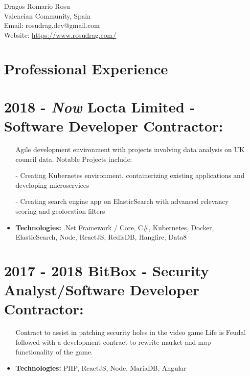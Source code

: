 \documentclass[12pt,a4paper]{res}
\begin{document}
\thispagestyle{empty}
  \begin{center}
  \Large{Dragos Romario Rosu  \\ [12pt]}
  \normalsize Valencian Community, Spain\\
  Email: rosudrag.dev@gmail.com\\
  Website: \url{https://www.rosudrag.com/}
  \end{center}
  
\begin{resume}
\vspace{-10mm}
\section{\large\bf Professional Experience}

\section{\bf 2018 - \textit{Now} \hspace{0.6mm} Locta Limited - Software Developer Contractor:}
\vspace{5mm}    
	\begin{itemize}
	\item[] Agile development environment with projects involving data analysis on UK council data. Notable Projects include: 
  \item[-] Creating Kubernetes environment, containerizing existing applications and developing microservices
  \item[-] Creating search engine app on ElasticSearch with advanced relevancy scoring and geolocation filters
	\item \textbf{Technologies:} .Net Framework / Core, C\#, Kubernetes, Docker, ElasticSearch, Node, ReactJS, RedisDB, Hangfire, Data8
	\end{itemize}
\section{\bf 2017 - 2018 \hspace{0.3mm} BitBox - Security Analyst/Software Developer Contractor:}
\vspace{5mm}    
	\begin{itemize}
	\item[]Contract to assist in patching security holes in the video game Life is Feudal followed with a development contract to rewrite market and map functionality of the game.
	\item \textbf{Technologies:} PHP, ReactJS, Node, MariaDB, Angular
	\end{itemize}

\end{resume}
\end{document}
